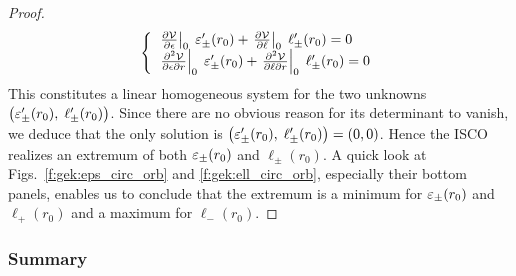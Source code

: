 \begin{proof}
\[
    \left\{\begin{array}{l}
       \left. \frac{\partial \mathcal{V}}{\partial \epsilon} \right| _0 \;  \varepsilon_\pm'(r_0)
    + \left. \frac{\partial \mathcal{V}}{\partial \ell} \right| _0 \;  \ell_\pm'(r_0) = 0 \\
    \left. \frac{\partial^2\mathcal{V}}{\partial\epsilon\partial r} \right| _0 \;  \varepsilon_\pm'(r_0)
    + \left. \frac{\partial^2\mathcal{V}}{\partial\ell\partial r} \right| _0 \;  \ell_\pm'(r_0) = 0
    \end{array} \right.
\]
This constitutes a linear homogeneous system for the two
unknowns $\left(\varepsilon_\pm'(r_0),\; \ell_\pm'(r_0)\right)$.
Since there are no obvious reason for its determinant to vanish, we deduce that
the only solution is $\left(\varepsilon_\pm'(r_0),\; \ell_\pm'(r_0)\right) = (0, 0)$.
Hence the ISCO realizes an extremum of both $\varepsilon_\pm(r_0)$ and $\ell_\pm(r_0)$.
A quick look at Figs.~\ref{f:gek:eps_circ_orb} and \ref{f:gek:ell_circ_orb},
especially their bottom panels, enables us to conclude that the extremum is
a minimum for $\varepsilon_\pm(r_0)$ and $\ell_+(r_0)$ and a maximum for $\ell_-(r_0)$.
\end{proof}

\subsubsection{Summary}

